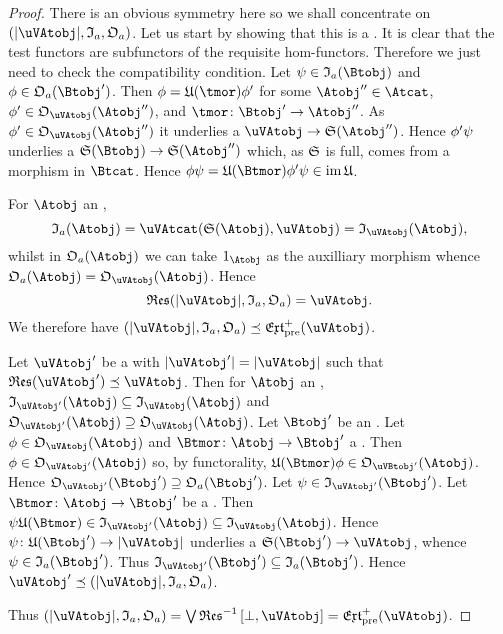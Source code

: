 \documentclass[%
a4paper,%
arxiv,%
defaults
]{myclass}
\begin{document}
\begin{proof}
There is an obvious symmetry here so we shall concentrate on \((\forfunc[\uVAtobj], \itest_a, \otest_a)\).
Let us start by showing that this is a \uVBtobj.
It is clear that the test functors are subfunctors of the requisite hom\hyp{}functors.
Therefore we just need to check the compatibility condition.
Let \(\ifn \in \itest_a(\Btobj)\) and \(\ofn \in \otest_a(\Btobj')\).
Then \(\ofn = \ufunc(\tmor) \ofn'\) for some \(\Atobj'' \in \Atcat\), \(\ofn' \in \otest_{\uVAtobj}(\Atobj'')\), and \(\tmor \colon \Btobj' \to \Atobj''\).
As \(\ofn' \in \otest_{\uVAtobj}(\Atobj'')\) it underlies a \uVBtmor \(\uVAtobj \to \sfunc(\Atobj'')\).
Hence \(\phi' \psi\) underlies a \uVBtmor \(\sfunc(\Btobj) \to \sfunc(\Atobj'')\) which, as \(\sfunc\) is full, comes from a morphism in \(\Btcat\).
Hence \(\ofn \ifn = \ufunc(\Btmor) \ofn' \ifn \in \im \ufunc\).

For \(\Atobj\) an \Atobjalt,
%
\[
  \itest_a(\Atobj) = \Hom{\uVAtcat}{\sfunc(\Atobj)}{\uVAtobj} = \itest_{\uVAtobj}(\Atobj),
\]
%
whilst in \(\otest_a(\Atobj)\) we can take \(1_{\Atobj}\) as the auxilliary morphism whence \(\otest_a(\Atobj) = \otest_{\uVAtobj}(\Atobj)\).
Hence
%
\[
  \resfunc(\forfunc[\uVAtobj], \itest_a, \otest_a) = \uVAtobj.
\]
%
We therefore have \((\forfunc[\uVAtobj], \itest_a, \otest_a) \preceq \PJextfunc(\uVAtobj)\).

Let \(\uVAtobj'\) be a \uVAtobjalt with \(\forfunc[\uVAtobj'] = \forfunc[\uVAtobj]\) such that \(\resfunc(\uVAtobj') \preceq \uVAtobj\).
Then for \(\Atobj\) an \Atobjalt, \(\itest_{\uVAtobj'}(\Atobj) \subseteq \itest_{\uVAtobj}(\Atobj)\) and \(\otest_{\uVAtobj'}(\Atobj) \supseteq \otest_{\uVAtobj}(\Atobj)\).
Let \(\Btobj'\) be an \Btobjalt.
Let \(\ofn \in \otest_{\uVAtobj}(\Atobj)\) and \(\Btmor \colon \Atobj \to \Btobj'\) a \Btmor.
Then \(\ofn \in \otest_{\uVAtobj'}(\Atobj)\) so, by functorality, \(\ufunc(\Btmor) \ofn \in \otest_{\uVBtobj'}(\Atobj)\).
Hence \(\otest_{\uVAtobj'}(\Btobj') \supseteq \otest_a(\Btobj')\).
Let \(\ifn \in \itest_{\uVAtobj'}(\Btobj')\).
Let \(\Btmor \colon \Atobj \to \Btobj'\) be a \Btmor.
Then \(\ifn \ufunc(\Btmor) \in \itest_{\uVAtobj'}(\Atobj) \subseteq \itest_{\uVAtobj}(\Atobj)\).
Hence \(\ifn \colon \ufunc(\Btobj') \to \forfunc[\uVAtobj]\) underlies a \uVBtmor \(\sfunc(\Btobj') \to \uVAtobj\), whence \(\ifn \in \itest_a(\Btobj')\).
Thus \(\itest_{\uVAtobj'}(\Btobj') \subseteq \itest_a(\Btobj')\).
Hence \(\uVAtobj' \preceq (\forfunc[\uVAtobj], \itest_a, \otest_a)\).

Thus \((\forfunc[\uVAtobj], \itest_a, \otest_a) = \join \resfunc^{-1}\left[\bot, \uVAtobj\right] = \PJextfunc(\uVAtobj)\).
\end{proof}
\end{document}
